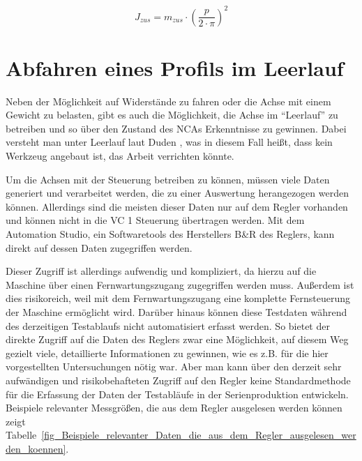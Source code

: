 


\begin{equation}\label{eq:Zusatzlast}
J_{zus} = m_{zus} \cdot \left(\frac{p}{2 \cdot \pi}\right)^2
\end{equation}


\begin{table}[h]
\centering

\caption{Trägheitsmoment durch eine Zusatzlast  $m_{zus}$ von \SI{20}{\kilogram}}
\label{tab:Traegheitsmoment_durch_Zusatzlast}
\end{table}





\section{Abfahren eines Profils im Leerlauf}\label{cha:Abfahren eines Profils im Leerlauf}



Neben der Möglichkeit auf Widerstände zu fahren oder die Achse mit einem Gewicht zu belasten, gibt es auch die Möglichkeit, die Achse im ``Leerlauf'' zu betreiben und so über den Zustand des NCAs Erkenntnisse zu gewinnen. Dabei versteht man unter Leerlauf laut Duden  \cite{Duden_Leerlauf}, was in diesem Fall heißt, dass kein Werkzeug angebaut ist, das Arbeit verrichten könnte.

Um die Achsen mit der Steuerung betreiben zu können, müssen viele Daten generiert und verarbeitet werden, die zu einer Auswertung herangezogen werden können. Allerdings sind die meisten dieser Daten nur auf dem Regler vorhanden und können nicht in die VC 1 Steuerung übertragen werden. Mit dem Automation Studio, ein Softwaretools des Herstellers B\&R des Reglers, kann direkt auf dessen Daten zugegriffen werden. 

Dieser Zugriff ist allerdings aufwendig und kompliziert, da hierzu auf die Maschine über einen Fernwartungszugang zugegriffen werden muss. Außerdem ist dies risikoreich, weil mit dem Fernwartungszugang eine komplette Fernsteuerung der Maschine ermöglicht wird. Darüber hinaus können diese Testdaten während des derzeitigen Testablaufs nicht automatisiert erfasst werden. So bietet der direkte Zugriff auf die Daten des Reglers zwar eine Möglichkeit, auf diesem Weg gezielt viele, detaillierte Informationen zu gewinnen, wie es z.B. für die hier vorgestellten Untersuchungen nötig war. Aber man kann über den derzeit sehr aufwändigen und risikobehafteten Zugriff auf den Regler keine Standardmethode für die Erfassung der Daten der Testabläufe in der Serienproduktion entwickeln. Beispiele relevanter Messgrößen, die aus dem Regler ausgelesen werden können zeigt Tabelle~\ref{fig_Beispiele_relevanter_Daten_die_aus_dem_Regler_ausgelesen_werden_koennen}.


